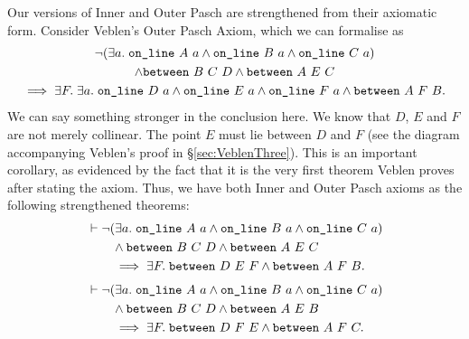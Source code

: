 Our versions of Inner and Outer Pasch are strengthened from their axiomatic form. Consider Veblen's Outer Pasch Axiom, which we can formalise as
\begin{multline*}
  \Triangle{a}{A}{B}{C} \\\wedge \between{B}{C}{D} \wedge \between{A}{E}{C}\\ \implies \exists F.\;\exists a.\;  \code{on\_line}\ D\ a \wedge \code{on\_line}\ E\ a \wedge \code{on\_line}\ F\ a \wedge \between{A}{F}{B}.
\end{multline*}
We can say something stronger in the conclusion here. We know that $D$, $E$ and $F$ are not merely collinear. The point $E$ must lie between $D$ and $F$ (see the diagram accompanying Veblen's proof in \S\ref{sec:VeblenThree}). This is an important corollary, as evidenced by the fact that it is the very first theorem Veblen proves after stating the axiom. Thus, we have both Inner and Outer Pasch axioms as the following strengthened theorems:
\begin{equation}\label{eq:OuterPasch}
  \begin{split}
    &\vdash\neg(\exists a.\; \texttt{on\_line}\ A\ a\wedge \texttt{on\_line}\ B\ a\wedge \texttt{on\_line}\ C\ a) \\
    &\qquad\wedge \texttt{between}\ B\ C\ D\wedge \texttt{between}\ A\ E\ C\\
    &\qquad\implies \exists F.\; \texttt{between}\ D\ E\ F \wedge \texttt{between}\ A\ F\ B.
  \end{split}
\end{equation}
\begin{equation}\label{eq:InnerPasch}
  \begin{split}
    &\vdash\neg(\exists a.\; \texttt{on\_line}\ A\ a\wedge \texttt{on\_line}\ B\ a\wedge \texttt{on\_line}\ C\ a) \\
    &\qquad\wedge \texttt{between}\ B\ C\ D \wedge \texttt{between}\ A\ E\ B\\ 
    &\qquad\implies \exists F.\; \texttt{between}\ D\ F\ E \wedge \texttt{between}\ A\ F\ C.
  \end{split}
\end{equation}

